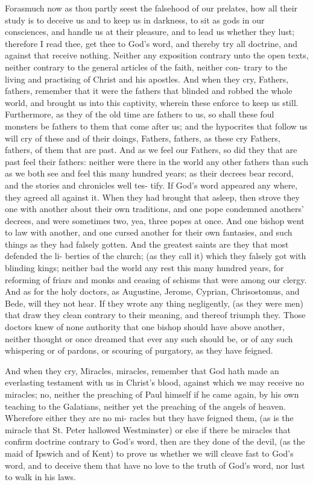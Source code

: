 \documentclass{custom}
\begin{document}
Forasmuch now as thou partly seest the falsehood of 
our prelates, how all their study is to deceive us and to 
keep us in darkness, to sit as gods in our consciences, and 
handle us at their pleasure, and to lead us whether they 
lust; therefore I read thee, get thee to God's word, and 
thereby try all doctrine, and against that receive nothing. 
Neither any exposition contrary unto the open texts, neither 
contrary to the general articles of the faith, neither con- 
trary to the living and practising of Christ and his apostles. 
And when they cry, Fathers, fathers, remember that it were
the fathers that blinded and robbed the whole world, and 
brought us into this captivity, wherein these enforce to 
keep us still. Furthermore, as they of the old time are 
fathers to us, so shall these foul monsters be fathers to 
them that come after us; and the hypocrites that follow us 
will cry of these and of their doings, Fathers, fathers, as 
these cry Fathers, fathers, of them that are past. And as we 
feel our Fathers, so did they that are past feel their fathers: 
neither were there in the world any other fathers than such 
as we both see and feel this many hundred years; as their 
decrees bear record, and the stories and chronicles well tes- 
tify. If God's word appeared any where, they agreed all 
against it. When they had brought that asleep, then 
strove they one with another about their own traditions, 
and one pope condemned anothers' decrees, and were 
sometimes two, yea, three popes at once. And one bishop 
went to law with another, and one cursed another for their 
own fantasies, and such things as they had falsely gotten. 
And the greatest saints are they that most defended the li- 
berties of the church; (as they call it) which they falsely got 
with blinding kings; neither bad the world any rest this 
many hundred years, for reforming of friars and monks 
and ceasing of schisms that were among our clergy. And 
as for the holy doctors, as Augustine, Jerome, Cyprian, 
Chrisostomus, and Bede, will they not hear. If they 
wrote any thing negligently, (as they were men) that draw 
they clean contrary to their meaning, and thereof triumph 
they. Those doctors knew of none authority that one 
bishop should have above another, neither thought or once 
dreamed that ever any such should be, or of any such 
whispering or of pardons, or scouring of purgatory, as 
they have feigned. 

And when they cry, Miracles, miracles, remember that 
God hath made an everlasting testament with us in Christ's 
blood, against which we may receive no miracles; no, neither 
the preaching of Paul himself if he came again, by his 
own teaching to the Galatians, neither yet the preaching of 
the angels of heaven. Wherefore either they are no mi- 
racles but they have feigned them, (as is the miracle that 
St. Peter hallowed Westminster) or else if there be miracles 
that confirm doctrine contrary to God's word, then are they 
done of the devil, (as the maid of Ipswich and of Kent) to 
prove us whether we will cleave fast to God's word, and 
to deceive them that have no love to the truth of God's 
word, nor lust to walk in his laws. 
\end{document}
